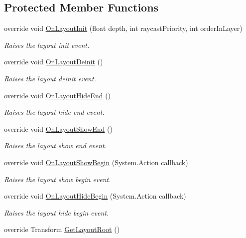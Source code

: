 \subsection*{Protected Member Functions}
\begin{DoxyCompactItemize}
\item 
override void \hyperlink{class_unity_engine_1_1_u_i_1_1_windows_1_1_types_1_1_tip_window_type_a55bb92f9f192f5ed6e6f32f81c83dadd}{On\+Layout\+Init} (float depth, int raycast\+Priority, int order\+In\+Layer)
\begin{DoxyCompactList}\small\item\em Raises the layout init event. \end{DoxyCompactList}\item 
override void \hyperlink{class_unity_engine_1_1_u_i_1_1_windows_1_1_types_1_1_tip_window_type_a7a5938ea02a65ea8f8b0b9650e13a6a1}{On\+Layout\+Deinit} ()
\begin{DoxyCompactList}\small\item\em Raises the layout deinit event. \end{DoxyCompactList}\item 
override void \hyperlink{class_unity_engine_1_1_u_i_1_1_windows_1_1_types_1_1_tip_window_type_a308f7f04e9d50607a312da594bd96e2f}{On\+Layout\+Hide\+End} ()
\begin{DoxyCompactList}\small\item\em Raises the layout hide end event. \end{DoxyCompactList}\item 
override void \hyperlink{class_unity_engine_1_1_u_i_1_1_windows_1_1_types_1_1_tip_window_type_ab1d7733c936e2fd1dc0584f5b7c5260f}{On\+Layout\+Show\+End} ()
\begin{DoxyCompactList}\small\item\em Raises the layout show end event. \end{DoxyCompactList}\item 
override void \hyperlink{class_unity_engine_1_1_u_i_1_1_windows_1_1_types_1_1_tip_window_type_a349cfa3ec876c285a081715f6896a0c9}{On\+Layout\+Show\+Begin} (System.\+Action callback)
\begin{DoxyCompactList}\small\item\em Raises the layout show begin event. \end{DoxyCompactList}\item 
override void \hyperlink{class_unity_engine_1_1_u_i_1_1_windows_1_1_types_1_1_tip_window_type_ad84aceea0b90fcd10efb0a83b3e1871c}{On\+Layout\+Hide\+Begin} (System.\+Action callback)
\begin{DoxyCompactList}\small\item\em Raises the layout hide begin event. \end{DoxyCompactList}\item 
override Transform \hyperlink{class_unity_engine_1_1_u_i_1_1_windows_1_1_types_1_1_tip_window_type_a6e1932332fddf565c987c10386de5dee}{Get\+Layout\+Root} ()
\end{DoxyCompactItemize}


